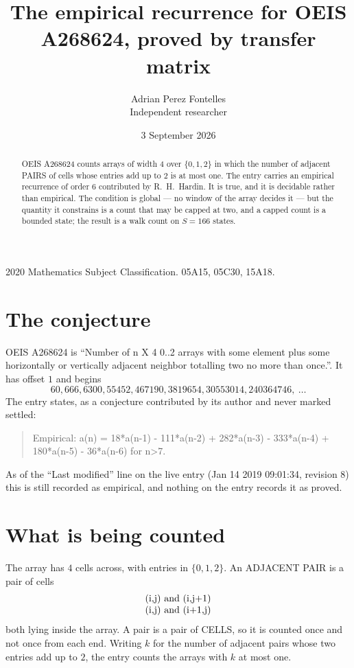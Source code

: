 \documentclass[11pt,a4paper]{article}
\title{The empirical recurrence for OEIS A268624, proved by transfer matrix}
\author{Adrian Perez Fontelles\\ \small Independent researcher}
\date{3 September 2026}
\theoremstyle{plain}
\theoremstyle{definition}
\begin{document}
\maketitle

\begin{abstract}
OEIS A268624 counts arrays of width $4$ over $\{0,1,2\}$ in which the number of adjacent PAIRS of
cells whose entries add up to $2$ is at most one. The entry carries an empirical recurrence of
order $6$ contributed by R.~H.~Hardin. It is true, and it is decidable rather than
empirical. The condition is global --- no window of the array decides it --- but the quantity
it constrains is a count that may be capped at two, and a capped count is a bounded state; the
result is a walk count on $S=166$ states.
\end{abstract}

\noindent\small 2020 Mathematics Subject Classification. 05A15, 05C30, 15A18.\normalsize

\section{The conjecture}

OEIS A268624 is ``Number of n X 4 0..2 arrays with some element plus some horizontally or vertically adjacent neighbor totalling two no more than once.''. It has offset $1$ and begins
\[
60, 666, 6300, 55452, 467190, 3819654, 30553014, 240364746,\ \dots
\]
The entry states, as a conjecture contributed by its author and never marked settled:
\begin{quote}
Empirical: a(n) = 18*a(n-1) - 111*a(n-2) + 282*a(n-3) - 333*a(n-4) + 180*a(n-5) - 36*a(n-6) for n>7.
\end{quote}
As of the ``Last modified'' line on the live entry (Jan 14 2019 09:01:34, revision 8) this is still
recorded as empirical, and nothing on the entry records it as proved.

\section{What is being counted}

The array has $4$ cells across, with entries in $\{0,1,2\}$. An ADJACENT PAIR is a pair of cells
\[
\begin{array}{l}
$(i,j)\text{ and }(i,j{+}1)$ \\
$(i,j)\text{ and }(i{+}1,j)$ \\
\end{array}
\]
both lying inside the array. A pair is a pair of CELLS, so it is counted once and not once from
each end. Writing $k$ for the number of adjacent pairs whose two entries add up to $2$, the
entry counts the arrays with $k$ at most one.
\end{document}
